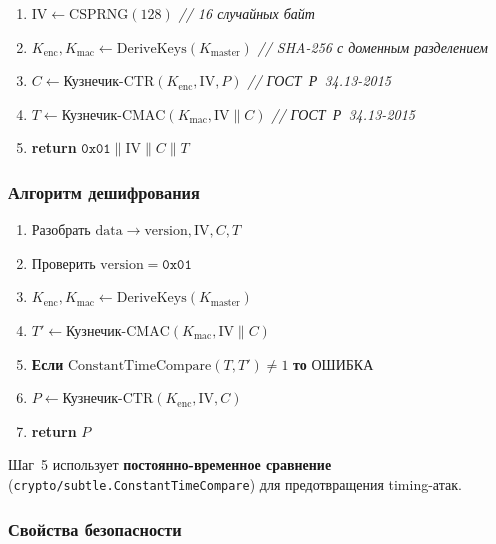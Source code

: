 \documentclass[a4paper,14pt]{extarticle}
\begin{document}
\begin{enumerate}
    \item $\mathrm{IV} \leftarrow \mathrm{CSPRNG}(128)$ \hfill\textit{// 16 случайных байт}
    \item $K_{\mathrm{enc}}, K_{\mathrm{mac}} \leftarrow \mathrm{DeriveKeys}(K_{\mathrm{master}})$ \hfill\textit{// SHA-256 с доменным разделением}
    \item $C \leftarrow \text{Кузнечик-CTR}(K_{\mathrm{enc}}, \mathrm{IV}, P)$ \hfill\textit{// ГОСТ~Р~34.13-2015}
    \item $T \leftarrow \text{Кузнечик-CMAC}(K_{\mathrm{mac}}, \mathrm{IV} \| C)$ \hfill\textit{// ГОСТ~Р~34.13-2015}
    \item \textbf{return} $\texttt{0x01} \| \mathrm{IV} \| C \| T$
\end{enumerate}

\subsubsection{Алгоритм дешифрования}

\begin{enumerate}
    \item Разобрать $\mathrm{data} \to \mathrm{version}, \mathrm{IV}, C, T$
    \item Проверить $\mathrm{version} = \texttt{0x01}$
    \item $K_{\mathrm{enc}}, K_{\mathrm{mac}} \leftarrow \mathrm{DeriveKeys}(K_{\mathrm{master}})$
    \item $T' \leftarrow \text{Кузнечик-CMAC}(K_{\mathrm{mac}}, \mathrm{IV} \| C)$
    \item \textbf{Если} $\mathrm{ConstantTimeCompare}(T, T') \neq 1$ \textbf{то} ОШИБКА
    \item $P \leftarrow \text{Кузнечик-CTR}(K_{\mathrm{enc}}, \mathrm{IV}, C)$
    \item \textbf{return} $P$
\end{enumerate}

Шаг~5 использует \textbf{постоянно-временное сравнение} (\texttt{crypto/subtle.ConstantTimeCompare}) для предотвращения timing-атак.

\subsubsection{Свойства безопасности}
\end{document}
